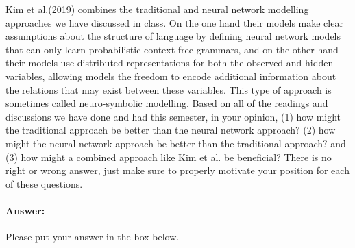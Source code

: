 \documentclass[10pt]{article}
\newenvironment{AnswerBox}{\begin{mdframed}[style=simple]}{\end{mdframed}}
\begin{document}
Kim et al.(2019) combines the traditional and neural network modelling approaches we have discussed in class. On the one hand their models make clear assumptions about the structure of language by defining neural network models that can only learn probabilistic context-free grammars, and on the other hand their models use distributed representations for both the observed and hidden variables, allowing models the freedom to encode additional information about the relations that may exist between these variables. This type of approach is sometimes called neuro-symbolic modelling. Based on all of the readings and discussions we have done and had this semester, in your opinion, (1) how might the traditional approach be better than the neural network approach? (2) how might the neural network approach be better than the traditional approach? and (3) how might a combined approach like Kim et al. be beneficial? There is no right or wrong answer, just make sure to properly motivate your position for each of these questions.

\paragraph{Answer:} Please put your answer in the box below.

\begin{AnswerBox}%


\end{AnswerBox}%
\end{document}
